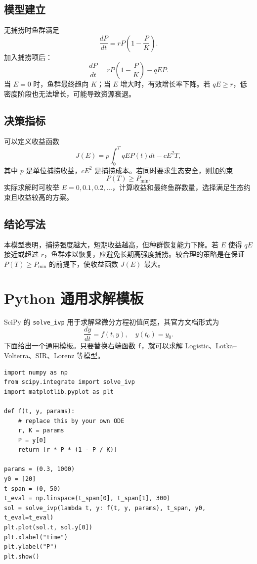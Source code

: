 \documentclass[11pt,a4paper]{ctexart}
\begin{document}
\subsection{模型建立}
无捕捞时鱼群满足
\[
\frac{dP}{dt}=rP\left(1-\frac{P}{K}\right).
\]
加入捕捞项后：
\[
\frac{dP}{dt}=rP\left(1-\frac{P}{K}\right)-qEP.
\]
当 $E=0$ 时，鱼群最终趋向 $K$；当 $E$ 增大时，有效增长率下降。若 $qE\ge r$，低密度阶段也无法增长，可能导致资源衰退。

\subsection{决策指标}
可以定义收益函数
\[
J(E)=p\int_0^T qEP(t)dt-cE^2T,
\]
其中 $p$ 是单位捕捞收益，$cE^2$ 是捕捞成本。若同时要求生态安全，则加约束
\[
P(T)\ge P_{\min}.
\]
实际求解时可枚举 $E=0,0.1,0.2,\ldots$，计算收益和最终鱼群数量，选择满足生态约束且收益较高的方案。

\subsection{结论写法}
本模型表明，捕捞强度越大，短期收益越高，但种群恢复能力下降。若 $E$ 使得 $qE$ 接近或超过 $r$，鱼群难以恢复，应避免长期高强度捕捞。较合理的策略是在保证 $P(T)\ge P_{\min}$ 的前提下，使收益函数 $J(E)$ 最大。

\section{Python 通用求解模板}

SciPy 的 \texttt{solve\_ivp} 用于求解常微分方程初值问题，其官方文档形式为
\[
\frac{dy}{dt}=f(t,y),\quad y(t_0)=y_0.
\]
下面给出一个通用模板。只要替换右端函数 \texttt{f}，就可以求解 Logistic、Lotka--Volterra、SIR、Lorenz 等模型。

\begin{lstlisting}[style=pythonstyle,caption={solve\_ivp 通用模板}]
import numpy as np
from scipy.integrate import solve_ivp
import matplotlib.pyplot as plt

def f(t, y, params):
    # replace this by your own ODE
    r, K = params
    P = y[0]
    return [r * P * (1 - P / K)]

params = (0.3, 1000)
y0 = [20]
t_span = (0, 50)
t_eval = np.linspace(t_span[0], t_span[1], 300)
sol = solve_ivp(lambda t, y: f(t, y, params), t_span, y0, t_eval=t_eval)
plt.plot(sol.t, sol.y[0])
plt.xlabel("time")
plt.ylabel("P")
plt.show()
\end{lstlisting}
\end{document}
